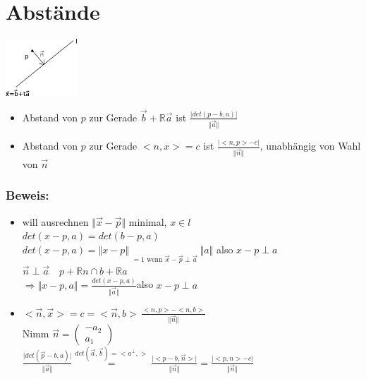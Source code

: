 \section{Abstände}
%


	\includegraphics[width=0.2\textwidth]{mainmatter/chapter1/pics/gerade.png}
%
\begin{itemize}
	\item Abstand von $p$ zur Gerade $\vec{b} + \mathbb{R}\vec{a}$ ist $\frac{\vert 
	det(p-b,a)\vert}{\Vert\vec{a}\Vert}$ 
	\item Abstand von $p$ zur Gerade $<n,x>=c$ ist $ \frac{\vert <n,p>-c\vert}{\Vert 
	\vec{n}\Vert}$, unabhängig von Wahl von $\vec{n}$
\end{itemize}
%
%
%
\subsubsection{Beweis:}
\begin{itemize}
	\item will ausrechnen $\Vert\vec{x}-\vec{p}\Vert$ minimal, $x \in l$\\
	$det(x-p,a)=det(b-p,a)$\\
	$det(x-p,a)=\Vert x-p\Vert\mathop{\underbrace{\sin\measuredangle(b-
	p,a)}}\limits_{=1\text{ wenn }\vec{x}-\vec{p}\perp\vec{a}}\Vert a\Vert$ also $x-p 	
	\perp a$\\
	$\vec{n}\perp\vec{a} \quad p+\mathbb{R}n \cap b +\mathbb{R}a$\\
	$\Rightarrow \Vert x-p,a\Vert=\frac{det(x-p,a)}{\Vert\vec{a}\Vert}$also $x-p\perp a$
	
	\item $<\vec{n},\vec{x}>=c=<\vec{n},b> \, \frac{<n,p>-<n,b>}{\Vert\vec{n}\Vert}$\\
	Nimm $\vec{n}=\begin{pmatrix} -a_{2} \\ a_{1} \end{pmatrix}$\\
	$\frac{\vert det(\vec{p}-b,a)\vert}{\Vert\vec{a}\Vert} \mathop{=}\limits^{det(\vec{a},
	\vec{b})
	=<a^{\perp},>}\frac{\vert <p-b,\vec{n}> \vert}{\Vert\vec{n}\Vert}=\frac{\vert<p,n>-
	c\vert}{\Vert\vec{n}\Vert}$
\end{itemize}
%
%
%
